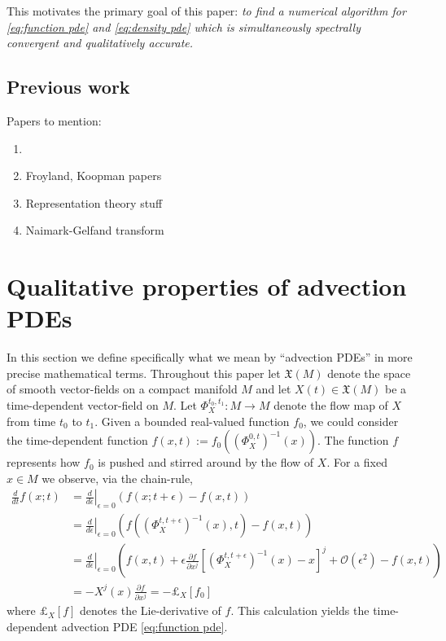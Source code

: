 \documentclass[12pt]{amsart}
\newcommand{\pder}[2]{\ensuremath{\frac{ \partial #1}{\partial #2}}}
\begin{document}
This motivates the primary goal of this paper:
\emph{to find a numerical algorithm for \eqref{eq:function pde} and \eqref{eq:density pde} which is simultaneously spectrally convergent and qualitatively accurate.}

\subsection{Previous work}
Papers to mention:
\begin{enumerate}
	\item \cite{HenrionKorda2014}
	\item Froyland, Koopman papers
	\item Representation theory stuff \cite{VershilGelfandGraev1975,Ismagilov1975}
	\item Naimark-Gelfand transform 
\end{enumerate}

\section{Qualitative properties of advection PDEs}
\label{sec:properties}
In this section we define specifically what we mean by ``advection PDEs'' in more precise mathematical terms.
Throughout this paper let $\mathfrak{X}(M)$ denote the space of smooth vector-fields on a compact manifold $M$
and let $X(t) \in \mathfrak{X}(M)$ be a time-dependent vector-field on $M$.
Let $\Phi^{t_{0},t_{1}}_{X}:M\to M$ denote the flow map of $X$ from time $t_{0}$ to $t_{1}$.
Given a bounded real-valued function $f_{0}$, we could consider the time-dependent function $f(x,t) := f_{0} ( (\Phi_{X}^{0,t})^{-1}(x) )$.
The function $f$ represents how $f_{0}$ is pushed and stirred around by the flow of $X$.
For a fixed $x \in M$ we observe, via the chain-rule,
\begin{align}
	 \frac{d}{dt}  f(x;t) &=  \left. \frac{d}{d \epsilon} \right|_{\epsilon=0} ( f(x;t+\epsilon) - f(x,t) ) \\
	 &=  \left. \frac{d}{d \epsilon} \right|_{\epsilon=0} \left( f( (\Phi_{X}^{t,t+\epsilon})^{-1}(x) , t ) - f(x,t) \right) \\
	 &=  \left. \frac{d}{d \epsilon} \right|_{\epsilon=0} \left( f(x,t) + \epsilon \pder{f}{x^{j}} [ (\Phi_{X}^{t,t+\epsilon})^{-1}(x) - x ]^{j} + \mathcal{O}(\epsilon^{2}) - f(x,t) \right) \\
	 &= - X^{j}(x) \pder{f}{x^{j}} = - \pounds_{X}[f_{0}]
\end{align}
where $\pounds_{X}[f]$ denotes the Lie-derivative of $f$.
This calculation yields the time-dependent advection PDE \eqref{eq:function pde}.
\end{document}
